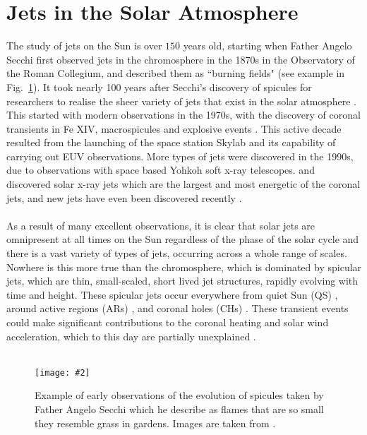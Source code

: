 \documentclass[12pt]{ociamthesis}
\newcommand{\mfig}[4]{
  \begin{figure}
  \begin{center}
  \texttt{[image: \#2]}
  \caption{#3}
  \label{#4}
  \end{center}
  \end{figure}}
\newcommand{\np}{\\ \\}
\begin{document}
\section{Jets in the Solar Atmosphere}
\label{sec:spicule-jets}
The study of jets on the Sun is over $150$ years old, starting when Father Angelo Secchi first observed jets in the chromosphere in the 1870s in the Observatory of the Roman Collegium, and described them as ``burning fields" (see example in Fig.~\ref{de_flammes}). It took nearly 100 years after Secchi's discovery of spicules for researchers to realise the sheer variety of jets that exist in the solar atmosphere \citep{Raouafi2016}. This started with modern observations in the 1970s, with the discovery of coronal transients in Fe XIV, macrospicules and explosive events \citep{Demastus1973, Bohlin1975ApJ197L133B, Withbroe1976ApJ, Brueckner1980HiA}. This active decade resulted from the launching of the space station Skylab and its capability of carrying out EUV observations. More types of jets were discovered in the 1990s, due to observations with space based Yohkoh soft x-ray telescopes. \cite{Shibata1992PASJ} and \cite{Strong1992PASJ} discovered solar x-ray jets which are the largest and most energetic of the coronal jets, and new jets have even been discovered recently \citep{Cho2019ApJ884L38C}. \np
%
As a result of many excellent observations, it is clear that solar jets are omnipresent at all times on the Sun regardless of the phase of the solar cycle and there is a vast variety of types of jets, occurring across a whole range of scales. Nowhere is this more true than the chromosphere, which is dominated by spicular jets, which are thin, small-scaled, short lived jet structures, rapidly evolving with time and height. These spicular jets occur everywhere from quiet Sun (QS) \citep{Pontieu2007astroph2081D,Rouppe2007ApJ660L169R,Pereira2012,Pereira2014ApJ}, around active regions (ARs) \citep{Pontieu2007astroph2081D,Pereira2012,Rouppe2013ApJ77656R,Gafeira2017ApJS2296G}, and coronal holes (CHs) \citep{Yamauchi2005ApJ629572Y,Moreno2008ApJ673L211M,Pereira2012,Young2015ApJ801124Y}. These transient events could make significant contributions to the coronal heating and solar wind acceleration, which to this day are partially unexplained \citep{Mart2017Sci3561269M, Pontieu2017ApJ, Samanta2019Sci, Zuo2019AcASn, Bale2019Natur}. \np
%
\mfig{0.75}{figures/flammes_alt.png}{Example of early observations of the evolution of spicules taken by Father Angelo Secchi which he describe as flames that are so small they resemble grass in gardens. Images are taken from \cite{Secchi1877}.}{de_flammes}
\end{document}
